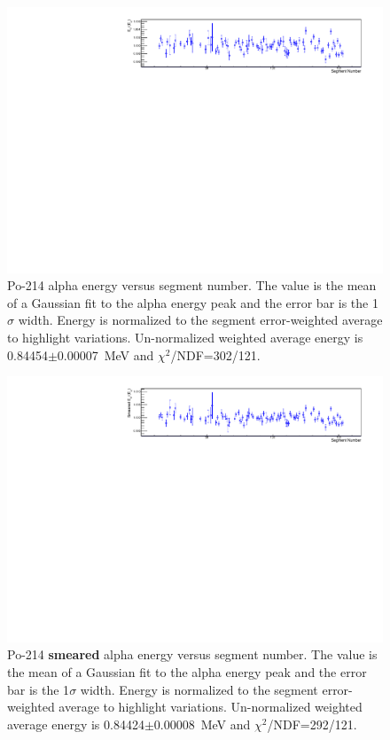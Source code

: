 \begin{figure}[!h]
\centering
\includegraphics[width=1.05\textwidth]{figures/PubBiPo214EvsCell.pdf}
\caption{\label{fig:EvsCell214}Po-214 alpha energy versus segment number. The value is the mean of a Gaussian fit to the alpha energy peak and the error bar is the 1$\sigma$ width. Energy is normalized to the segment error-weighted average to highlight variations. Un-normalized weighted average energy is 0.84454$\pm$0.00007~MeV and $\chi^2$/NDF=302/121.} 
\end{figure}
\begin{figure}[!h]
\centering
\includegraphics[width=1.05\textwidth]{figures/PubBiPo214EsmearvsCell.pdf}
\caption{\label{fig:EsmearvsCell214}Po-214 {\bf smeared} alpha energy versus segment number. The value is the mean of a Gaussian fit to the alpha energy peak and the error bar is the 1$\sigma$ width. Energy is normalized to the segment error-weighted average to highlight variations. Un-normalized weighted average energy is 0.84424$\pm$0.00008~MeV and $\chi^2$/NDF=292/121.} 
\end{figure}
\clearpage
\newpage


